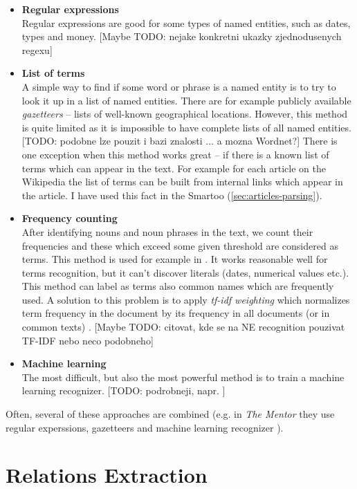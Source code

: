 \documentclass[a4paper, 12pt, twoside]{fithesis2}		%
\renewcommand{\_}{\leavevmode \kern0.07em\vbox{\hrule width0.4em}}
\newcommand{\squarebullet}{\textcolor{black}{\raisebox{0.15em}{\rule{4pt}{4pt}}}}
\newenvironment{myItemize}{
  \begin{itemize}[leftmargin=2em,rightmargin=1em,itemsep=\parskip ,parsep=0em,topsep=0em,partopsep=0em]
  \renewcommand{\labelitemi}{\squarebullet}
  \renewcommand{\labelitemii}{$\diamond$}
}{
  \end{itemize}
}
\begin{document}
\begin{myItemize}
\item \textbf{Regular expressions}\\
  Regular expressions are good for some types of named entities, such as dates, types and money.
  [Maybe TODO: nejake konkretni ukazky zjednodusenych regexu]
\item \textbf{List of terms}\\
  A simple way to find if some word or phrase is a named entity is to try to look it up in a list of named entities. There are for example publicly available \textit{gazetteers} -- lists of well-known geographical locations. However, this method is quite limited as it is impossible to have complete lists of all named entities.
  [TODO: podobne lze pouzit i bazi znalosti ... a mozna Wordnet?]
  There is one exception when this method works great -- if there is a known list of terms which can appear in the text. For example for each article on the Wikipedia the list of terms can be built from internal links which appear in the article. I have used this fact in the Smartoo (\autoref{sec:articles-parsing}).
\item \textbf{Frequency counting}\\
  After identifying nouns and noun phrases in the text, we count their frequencies and these which exceed some given threshold are considered as terms.
  This method is used for example in \cite{question-gen-mitkov}. It works reasonable well for terms recognition, but it can't discover literals (dates, numerical values etc.).
This method can label as terms also common names which are frequently used.
A solution to this problem is to apply \textit{tf-idf weighting} which normalizes term frequency in the document by its frequency in all documents (or in common texts) \cite[][118]{information-retrieval}.
[Maybe TODO: citovat, kde se na NE recognition pouzivat TF-IDF nebo neco podobneho]
\item \textbf{Machine learning}\\
  The most difficult, but also the most powerful method is to train a machine learning recognizer.
  [TODO: podrobneji, napr. \cite[][283]{nlp-python}]
\end{myItemize}
Often, several of these approaches are combined (e.g. in \textit{The Mentor} they use regular experssions, gazetteers and machine learning recognizer \cite{mentor}).


\section{Relations Extraction}
\label{sec:relations-extraction}
\end{document}
